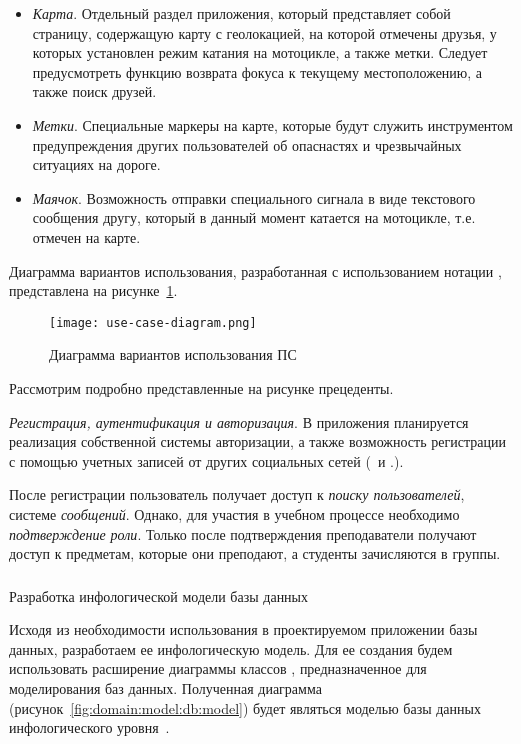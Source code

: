 \begin{itemize}
	\item \emph{Карта}. Отдельный раздел приложения, который представляет собой страницу, содержащую карту с геолокацией, на которой отмечены друзья, у которых установлен режим катания на мотоцикле, а также метки. Следует предусмотреть функцию возврата фокуса к текущему местоположению, а также поиск друзей.
	\item \emph{Метки}. Специальные маркеры на карте, которые будут служить инструментом предупреждения других пользователей об опаснастях и чрезвычайных ситуациях на дороге.
	\item \emph{Маячок}. Возможность отправки специального сигнала в виде текстового сообщения другу, который в данный момент катается на мотоцикле, т.е. отмечен на карте.
\end{itemize}

Диаграмма вариантов использования, разработанная с использованием нотации \uml, представлена на рисунке~\ref{fig:domain:model:use_cases:model}.

\begin{figure}[ht]
\centering
	\texttt{[image: use-case-diagram.png]}
	\caption{Диаграмма вариантов использования ПС}
	\label{fig:domain:model:use_cases:model}
\end{figure}

Рассмотрим подробно представленные на рисунке прецеденты.

\emph{Регистрация, аутентификация и авторизация}. В приложения планируется реализация собственной системы авторизации, а также возможность регистрации с помощью учетных записей от других социальных сетей (\facebook~и \vk.).

После регистрации пользователь получает доступ к \emph{поиску пользователей}, системе \emph{сообщений}. Однако, для участия в учебном процессе необходимо \emph{подтверждение роли}. Только после подтверждения преподаватели получают доступ к предметам, которые они преподают, а студенты зачисляются в группы. 



\subsubsection{} Разработка инфологической модели базы данных
\label{sec:domain:model:db}

Исходя из необходимости использования в проектируемом приложении базы данных, разработаем ее инфологическую модель. Для ее создания будем использовать расширение диаграммы классов \uml, предназначенное для моделирования баз данных. Полученная диаграмма (рисунок~\ref{fig:domain:model:db:model}) будет являться моделью базы данных инфологического уровня~\cite{kulikov_db_workbook}.

